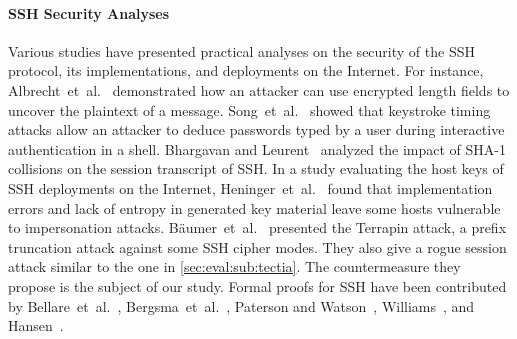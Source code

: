 \paragraph{SSH Security Analyses} 

Various studies have presented practical analyses on the security of the SSH protocol, its implementations, and deployments on the Internet. For instance, Albrecht~et~al.~\cite{SP:AlbPatWat09} demonstrated how an attacker can use encrypted length fields to uncover the plaintext of a message. Song~et~al.~\cite{USENIX:SonWagTia01} showed that keystroke timing attacks allow an attacker to deduce passwords typed by a user during interactive authentication in a shell. Bhargavan and Leurent~\cite{NDSS:BhaLeu16} analyzed the impact of SHA-1 collisions on the session transcript of SSH. In a study evaluating the host keys of SSH deployments on the Internet, Heninger~et~al.~\cite{USENIX:HDWH12} found that implementation errors and lack of entropy in generated key material leave some hosts vulnerable to impersonation attacks. Bäumer~et~al.~\cite{USENIX:BauBriSch24} presented the Terrapin attack, a prefix truncation attack against some SSH cipher modes. They also give a rogue session attack similar to the one in \autoref{sec:eval:sub:tectia}. The countermeasure they propose is the subject of our study. Formal proofs for SSH have been contributed by Bellare~et~al.~\cite{CCS:BelKohNam02}, Bergsma~et~al.~\cite{CCS:BDKSS14}, Paterson and Watson~\cite{EC:PatWat10}, Williams~\cite{IMA:Williams11}, and Hansen~\cite{hansen2020cryptographic}.